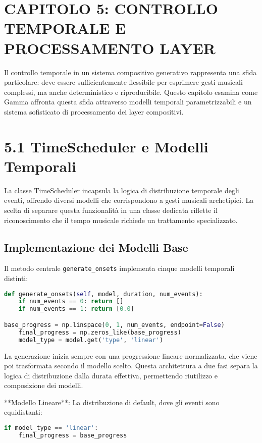
\section{CAPITOLO 5: CONTROLLO TEMPORALE E PROCESSAMENTO LAYER}
Il controllo temporale in un sistema compositivo generativo rappresenta una sfida particolare: deve essere sufficientemente flessibile per esprimere gesti musicali complessi, ma anche deterministico e riproducibile. Questo capitolo esamina come Gamma affronta questa sfida attraverso modelli temporali parametrizzabili e un sistema sofisticato di processamento dei layer compositivi.
\section{5.1 TimeScheduler e Modelli Temporali}
La classe TimeScheduler incapsula la logica di distribuzione temporale degli eventi, offrendo diversi modelli che corrispondono a gesti musicali archetipici. La scelta di separare questa funzionalità in una classe dedicata riflette il riconoscimento che il tempo musicale richiede un trattamento specializzato.
\subsection{Implementazione dei Modelli Base}
Il metodo centrale \texttt{generate\_onsets} implementa cinque modelli temporali distinti:

\begin{lstlisting}[language=Python]
def generate_onsets(self, model, duration, num_events):
    if num_events == 0: return []
    if num_events == 1: return [0.0]

base_progress = np.linspace(0, 1, num_events, endpoint=False)
    final_progress = np.zeros_like(base_progress)
    model_type = model.get('type', 'linear')
\end{lstlisting}

La generazione inizia sempre con una progressione lineare normalizzata, che viene poi trasformata secondo il modello scelto. Questa architettura a due fasi separa la logica di distribuzione dalla durata effettiva, permettendo riutilizzo e composizione dei modelli.

**Modello Lineare**: La distribuzione di default, dove gli eventi sono equidistanti:
\begin{lstlisting}[language=Python]
if model_type == 'linear':
    final_progress = base_progress
\end{lstlisting}

